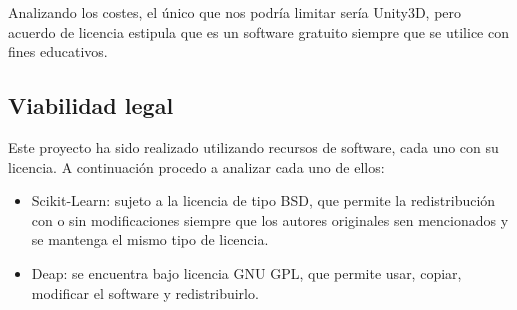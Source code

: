 Analizando los costes, el único que nos podría limitar sería Unity3D, pero acuerdo de licencia estipula que es un software gratuito siempre que se utilice con fines educativos.

\subsection{Viabilidad legal}

Este proyecto ha sido realizado utilizando recursos de software, cada uno con su licencia. A continuación procedo a analizar cada uno de ellos:
\begin{itemize}
    \item Scikit-Learn: sujeto a la licencia de tipo BSD, que permite la redistribución con o sin modificaciones siempre que los autores originales sen mencionados y se mantenga el mismo tipo de licencia.
    \item Deap: se encuentra bajo licencia GNU GPL, que permite usar, copiar, modificar el software y redistribuirlo.
\end{itemize}
